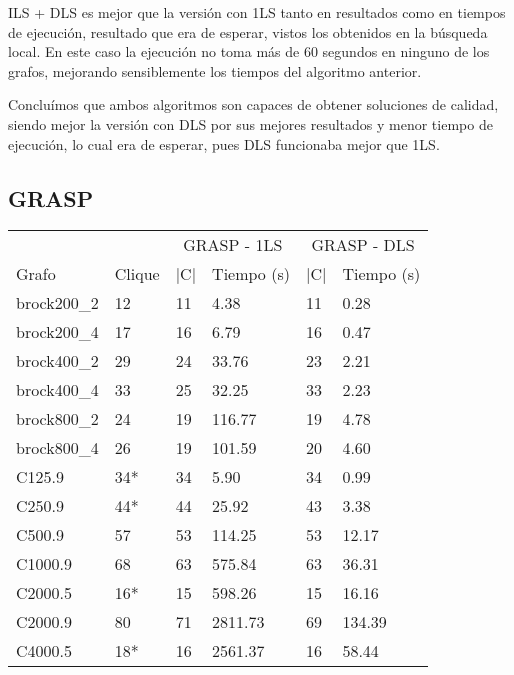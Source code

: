 ILS + DLS es mejor que la versión con 1LS tanto en resultados como en tiempos de
ejecución, resultado que era de esperar, vistos los obtenidos en la búsqueda local.
En este caso la ejecución no toma más de $60$ segundos en ninguno de los grafos,
mejorando sensiblemente los tiempos del algoritmo anterior.

Concluímos que ambos algoritmos son capaces de obtener soluciones de calidad,
siendo mejor la versión con DLS por sus mejores resultados y menor tiempo de
ejecución, lo cual era de esperar, pues DLS funcionaba mejor que 1LS.

\subsection{GRASP}

\begin{small}
\begin{longtable}{l l l l l l}
  \label{table:grasp}\\
    & & \multicolumn{2}{c}{GRASP - 1LS} & \multicolumn{2}{c}{GRASP - DLS} \\ \cline{3-6}
    Grafo              & Clique & |C| & Tiempo (s) & |C| & Tiempo (s) \\ \hline
    \endhead
    \endfoot
    brock200\_2        & 12 & 11 & 4.38 & 11 & 0.28\\ \hline
    brock200\_4        & 17 & 16 & 6.79 & 16 & 0.47\\ \hline
    brock400\_2        & 29 & 24 & 33.76 & 23 & 2.21\\ \hline
    brock400\_4        & 33 & 25 & 32.25 & 33 & 2.23\\ \hline
    brock800\_2        & 24 & 19 & 116.77 & 19 & 4.78\\ \hline
    brock800\_4        & 26 & 19 & 101.59 & 20 & 4.60\\ \hline
    C125.9             & 34* & 34 & 5.90 & 34 & 0.99\\ \hline
    C250.9             & 44* & 44 & 25.92 & 43 & 3.38\\ \hline
    C500.9             & 57 & 53 & 114.25 & 53 & 12.17\\ \hline
    C1000.9            & 68 & 63 & 575.84 & 63 & 36.31\\ \hline
    C2000.5            & 16* & 15 & 598.26 & 15 & 16.16\\ \hline
    C2000.9            & 80 & 71 & 2811.73 & 69 & 134.39\\ \hline
    C4000.5            & 18* & 16 & 2561.37 & 16 & 58.44\\ \hline

\end{longtable}
\end{small}
